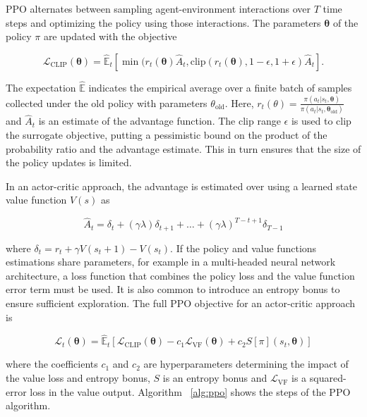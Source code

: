 PPO alternates between sampling agent-environment interactions over \(T\) time steps and optimizing the policy using those interactions.
The parameters \(\boldsymbol{\theta}\) of the policy \(\pi\) are updated with the objective

\begin{equation}
    \mathcal{L}_\text{CLIP}(\boldsymbol{\theta}) = 
    \hat{\mathbb{E}}_t \left\lbrack \min(r_t(\boldsymbol{\theta}) \hat{A}_t, \text{clip}(r_t(\boldsymbol{\theta}),1-\epsilon, 1+\epsilon) \hat{A}_t \right\rbrack.
\end{equation}

The expectation \(\mathbb{\hat{E}}\) indicates the empirical average over a finite batch of samples collected under the old policy with parameters \(\theta_{\text{old}}\).
Here, \(r_t(\theta) = \frac{\pi(a_t | s_t, \boldsymbol{\theta})}{\pi(a_t | s_t, \boldsymbol{\theta}_{\text{old}})}\) and \(\hat{A}_t\) is an estimate 
of the advantage function.
The clip range \(\epsilon\) is used to clip the surrogate objective,
putting a pessimistic bound on the product of the probability ratio and the advantage estimate.
This in turn ensures that the size of the policy updates is limited.

In an actor-critic approach, the advantage is estimated over using a learned state value function \(V(s)\) as 

\begin{equation}
    \hat{A}_t = \delta_t + (\gamma\lambda) \delta_{t+1} + \dots + (\gamma\lambda)^{T-t+1} \delta_{T-1}
\end{equation}

where \(\delta_t = r_t + \gamma V(s_t+1) - V(s_t)\).
If the policy and value functions estimations share parameters, for example in a multi-headed neural network architecture, a loss function that combines the policy loss and the value function error term must be used.
It is also common to introduce an entropy bonus to ensure sufficient exploration.
The full PPO objective for an actor-critic approach is

\begin{equation}
    \mathcal{L}_t(\boldsymbol{\theta}) =
    \hat{\mathbb{E}}_t
    \left\lbrack
    \mathcal{L}_\text{CLIP}(\boldsymbol{\theta}) -
    c_1 \mathcal{L}_\text{VF}(\boldsymbol{\theta}) +
    c_2 S [\pi](s_t, \boldsymbol{\theta})
    \right\rbrack
\end{equation}

where the coefficients \(c_1\) and \(c_2\) are hyperparameters determining the impact of the value loss and entropy bonus,
\(S\) is an entropy bonus and \(\mathcal{L}_\text{VF}\) is a squared-error loss in the value output. Algorithm ~\ref{alg:ppo} shows the steps of the PPO algorithm.

